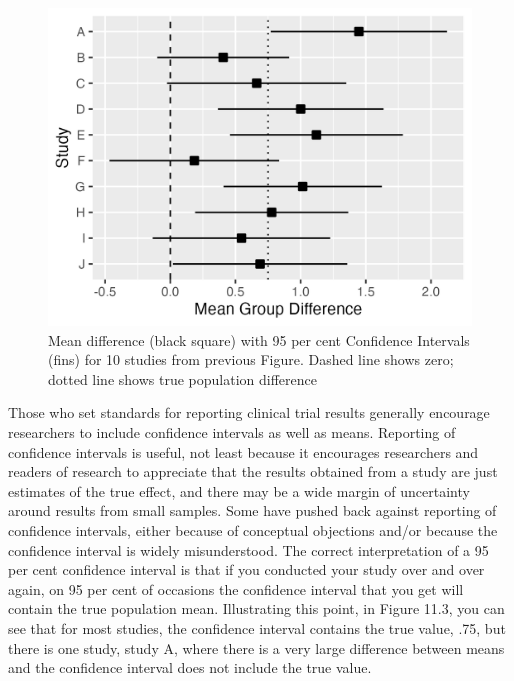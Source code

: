 \documentclass{krantz}
\begin{document}
\begin{center}
\begin{figure}
\includegraphics[width=0.75\linewidth]{images_bw/carbo10CI} \caption{Mean difference (black square) with 95 per cent Confidence Intervals (fins) for 10 studies from previous Figure. Dashed line shows zero; dotted line shows true population difference}\label{fig:ciplot}
\end{figure}
\end{center}

\begin{tcolorbox}[colback=Black!5!lightgray,colframe=black!75!black,coltitle=white,title=Reporting of confidence intervals]\label{box:confint}
Those who set standards for reporting clinical trial results generally encourage researchers to include confidence intervals as well as means. Reporting of confidence intervals is useful, not least because it encourages researchers and readers of research to appreciate that the results obtained from a study are just estimates of the true effect, and there may be a wide margin of uncertainty around results from small samples.  Some have pushed back against reporting of confidence intervals, either because of conceptual objections and/or because the confidence interval is widely misunderstood. The correct interpretation of a 95 per cent confidence interval is that if you conducted your study over and over again, on 95 per cent of occasions the confidence interval that you get will contain the true population mean. Illustrating this point, in Figure 11.3, you can see that for most studies, the confidence interval contains the true value, .75, but there is one study, study A, where there is a very large difference between means and the confidence interval does not include the true value. 
\end{tcolorbox}
\end{document}
